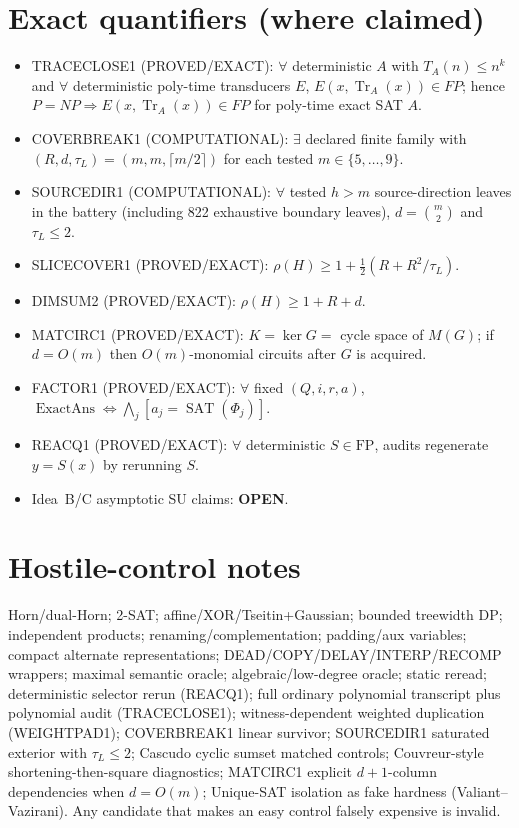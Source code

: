 \documentclass[11pt]{article}
\begin{document}
\section*{Exact quantifiers (where claimed)}
\begin{itemize}
\item TRACECLOSE1 (PROVED/EXACT): $\forall$ deterministic $A$ with $T_A(n)\le n^k$ and
$\forall$ deterministic poly-time transducers $E$, $E(x,\operatorname{Tr}_A(x))\in FP$;
hence $P=NP\Rightarrow E(x,\operatorname{Tr}_A(x))\in FP$ for poly-time exact SAT $A$.
\item COVERBREAK1 (COMPUTATIONAL): $\exists$ declared finite family with
$(R,d,\tau_L)=(m,m,\lceil m/2\rceil)$ for each tested $m\in\{5,\ldots,9\}$.
\item SOURCEDIR1 (COMPUTATIONAL): $\forall$ tested $h>m$ source-direction leaves in the battery
(including 822 exhaustive boundary leaves), $d=\binom{m}{2}$ and $\tau_L\le 2$.
\item SLICECOVER1 (PROVED/EXACT): $\rho(H)\ge 1+\tfrac12(R+R^2/\tau_L)$.
\item DIMSUM2 (PROVED/EXACT): $\rho(H)\ge 1+R+d$.
\item MATCIRC1 (PROVED/EXACT): $K=\ker G=$ cycle space of $M(G)$; if $d=O(m)$ then
$O(m)$-monomial circuits after $G$ is acquired.
\item FACTOR1 (PROVED/EXACT): $\forall$ fixed $(Q,i,r,a)$,
$\operatorname{ExactAns}\iff\bigwedge_j[a_j=\operatorname{SAT}(\Phi_j)]$.
\item REACQ1 (PROVED/EXACT): $\forall$ deterministic $S\in\mathrm{FP}$, audits regenerate $y=S(x)$
by rerunning $S$.
\item Idea~B/C asymptotic SU claims: \textbf{OPEN}.
\end{itemize}

\section*{Hostile-control notes}
Horn/dual-Horn; 2-SAT; affine/XOR/Tseitin+Gaussian; bounded treewidth DP; independent products;
renaming/complementation; padding/aux variables; compact alternate representations;
DEAD/COPY/DELAY/INTERP/RECOMP wrappers; maximal semantic oracle; algebraic/low-degree oracle;
static reread; deterministic selector rerun (REACQ1); full ordinary polynomial transcript plus
polynomial audit (TRACECLOSE1); witness-dependent weighted duplication (WEIGHTPAD1);
COVERBREAK1 linear survivor; SOURCEDIR1 saturated exterior with $\tau_L\le 2$; Cascudo cyclic
sumset matched controls; Couvreur-style shortening-then-square diagnostics; MATCIRC1 explicit
$d+1$-column dependencies when $d=O(m)$; Unique-SAT isolation as fake hardness (Valiant--Vazirani).
Any candidate that makes an easy control falsely expensive is invalid.
\end{document}
